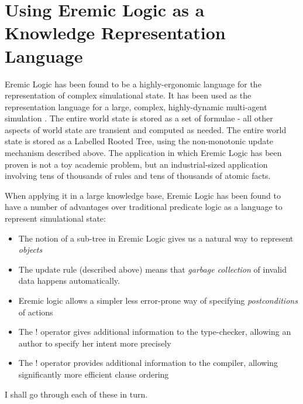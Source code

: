 \section{Using Eremic Logic as a Knowledge Representation Language}\label{kr}

Eremic Logic has been found to be a highly-ergonomic language for the
representation of complex simulational state.  It has been used as the
representation language for a large, complex, highly-dynamic
multi-agent simulation \cite{evans-and-short}.  The entire world state
is stored as a set of formulae - all other aspects of world state are
transient and computed as needed.  The entire world state is stored as
a Labelled Rooted Tree, using the non-monotonic update mechanism
described above.  The application in which Eremic Logic has been
proven is not a toy academic problem, but an industrial-sized
application involving tens of thousands of rules and tens of thousands
of atomic facts.

When applying it in a large knowledge base, Eremic Logic has been found to have a number of advantages over traditional predicate logic as a language to represent simulational state:
\begin{itemize}
\item
The notion of a sub-tree in Eremic Logic gives us a natural way to represent \emph{objects}
\item
The update rule (described above) means that \emph{garbage collection} of invalid data happens automatically.
\item
Eremic logic allows a simpler less error-prone way of specifying \emph{postconditions} of actions
\item
The $!$ operator gives additional information to the type-checker, allowing an author to specify her intent more precisely
\item
The $!$ operator provides additional information to the compiler, allowing significantly more efficient clause ordering
\end{itemize}
I shall go through each of these in turn.


